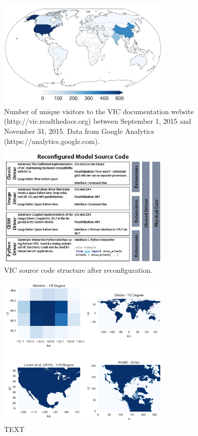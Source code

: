 \documentclass[gmd, manuscript]{copernicus}
\begin{document}
\begin{figure}[t]
\includegraphics[width=8.3cm]{VIC_users.jpg}
\caption{Number of unique visitors to the VIC documentation website (http://vic.readthedocs.org) between September 1, 2015 and November 31, 2015. Data from Google Analytics (https://analytics.google.com).}
\label{fig:vic_users}
\end{figure}

\begin{figure}[t]
\includegraphics[width=8.3cm]{VIC_config.jpg}
\caption{VIC source code structure after reconfiguration. }
\label{fig:vic_config}
\end{figure}

%
%
\begin{figure}[t]
\includegraphics[width=8.3cm]{VIC_domains.jpg}
\caption{TEXT}
\label{fig:vic_domains}
\end{figure}
\end{document}
